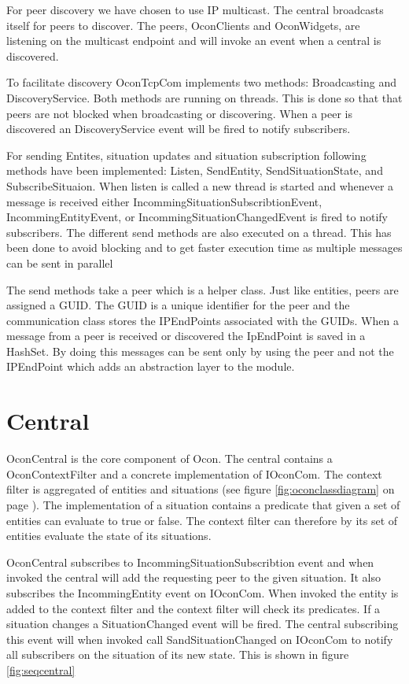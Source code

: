 \documentclass[../report.tex]{subfiles}
\begin{document}
For peer discovery we have chosen to use IP multicast. The central broadcasts itself for peers to discover. The peers, OconClients and OconWidgets, are listening on the multicast endpoint and will invoke an event when a central is discovered.

To facilitate discovery OconTcpCom implements two methods: Broadcasting and DiscoveryService. Both methods are running on threads. This is done so that that peers are not blocked when broadcasting or discovering. When a peer is discovered an DiscoveryService event will be fired to notify subscribers.

For sending Entites, situation updates and situation subscription following methods have been implemented: Listen, SendEntity, SendSituationState, and SubscribeSituaion. When listen is called a new thread is started and whenever a message is received either IncommingSituationSubscribtionEvent, IncommingEntityEvent, or IncommingSituationChangedEvent is fired to notify subscribers. The different send methods are also executed on a thread. This has been done to avoid blocking and to get faster execution time as multiple messages can be sent in parallel

The send methods take a peer which is a helper class. Just like entities, peers are assigned a GUID. The GUID is a unique identifier for the peer and the communication class stores the IPEndPoints associated with the GUIDs. When a message from a peer is received or discovered the IpEndPoint is saved in a HashSet. By doing this messages can be sent only by using the peer and not the IPEndPoint which adds an abstraction layer to the module. 

\section{Central}
OconCentral is the core component of Ocon. The central contains a OconContextFilter and a concrete implementation of IOconCom. The context filter is aggregated of entities and situations (see figure \ref{fig:oconclassdiagram} on page \pageref{fig:oconclassdiagram}). The implementation of a situation contains a predicate that given a set of entities can evaluate to true or false. The context filter can therefore by its set of entities evaluate the state of its situations.

OconCentral subscribes to IncommingSituationSubscribtion event and when invoked the central will add the requesting peer to the given situation. It also subscribes the IncommingEntity event on IOconCom. When invoked the entity is added to the context filter and the context filter will check its predicates. If a situation changes a SituationChanged event will be fired. The central subscribing this event will when invoked call SandSituationChanged on IOconCom to notify all subscribers on the situation of its new state. This is shown in figure \ref{fig:seqcentral}
\end{document}
